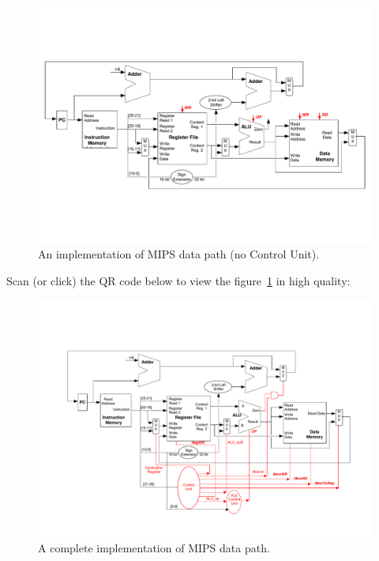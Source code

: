 \begin{figure}[!htp]
    \centering
    \includegraphics[width=\textwidth]{img/implementation-mips-datapath.pdf}
    \caption{An implementation of MIPS data path (no Control Unit).\cite{pipelining-slides}}
    \label{fig: implementation of MIPS data path (no Control Unit)}
\end{figure}

\newpage

\noindent
Scan (or click) the QR code below to view the figure~\ref{fig: implementation of MIPS data path (no Control Unit)} in high quality:
\begin{center}
\end{center}

\begin{figure}[!htp]
    \centering
    \includegraphics[width=\textwidth]{img/implementation-mips-datapath-cu.pdf}
    \caption{A complete implementation of MIPS data path.\cite{pipelining-slides}}
    \label{fig: complete implementation of MIPS data path}
\end{figure}

